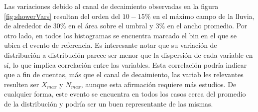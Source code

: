 	Las variaciones debido al canal de decaimiento observadas en la figura \ref{fig:showerVars} resultan del orden del $10-15\%$ en el m\'aximo campo de la lluvia, de alrededor de $30\%$ en el \'area sobre el umbral y $3\%$ en el ancho promedio.
	Por otro lado, en todos los histogramas se encuentra marcado el bin en el que se ubica el evento de referencia.
	Es interesante notar que su variaci\'on de distribuci\'on a distribuci\'on parece ser menor que la dispersi\'on de cada variable en s\'i, lo que implica correlaci\'on entre las variables.
	Esta correlaci\'on podr\'ia indicar que a fin de cuentas, m\'as que el canal de decaimiento, las variab les relevantes resulten ser $X_{max}$ y $N_{max}$, aunque esta afirmaci\'on requiere m\'as estudios.
	De cualquier forma, este evento se encuentra en todos los casos cerca del promedio de la distribuci\'on y podr\'ia ser un buen representante de las mismas.